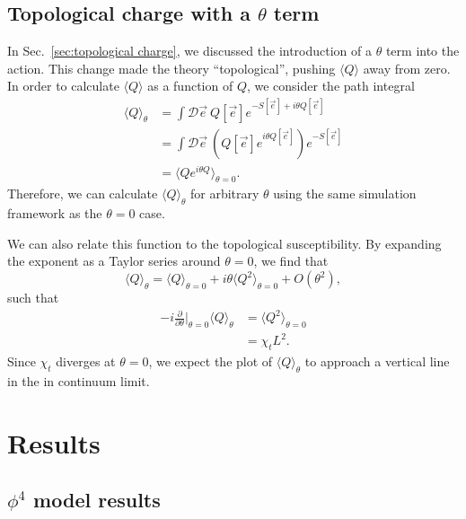 \documentclass[12pt]{report}
\newcommand{\e}{\vec e}
\begin{document}
\section{Topological charge with a $\theta$ term}
\label{sec:topotheta}
In Sec.~\ref{sec:topological charge}, we discussed the introduction of a $\theta$ term into the action. This change made the theory ``topological'', pushing $\langle Q \rangle$ away from zero. In order to calculate $\langle Q \rangle$ as a function of $Q$, we consider the path integral
\begin{align}
    \langle Q \rangle_\theta &=\int \mathcal{D}\e\:Q[\e]e^{-S[\e]+i\theta Q[\e]} \\
                             &=\int \mathcal{D}\e\:\left( Q[\e]e^{i\theta Q[\e]} \right) e^{-S[\e]} \\
                             &=\langle Q e^{i \theta Q} \rangle_{\theta=0}.
\end{align}
Therefore, we can calculate $\langle Q \rangle_\theta$ for arbitrary $\theta$ using the same simulation framework as the $\theta=0$ case.

We can also relate this function to the topological susceptibility. By expanding the exponent as a Taylor series around $\theta=0$, we find that  
\begin{equation}
    \langle Q \rangle_\theta = \langle Q \rangle_{\theta=0} + i \theta \langle Q^2 \rangle_{\theta=0} + O(\theta^2),
\end{equation}
such that 
\begin{align}
    -i \frac{\partial}{\partial \theta}\Big|_{\theta=0} \langle Q \rangle_\theta &= \langle Q^2 \rangle_{\theta=0}\\
                                                              &= \chi_t L^2.
\end{align}
Since $\chi_t$ diverges at $\theta=0$, we expect the plot of $\langle Q\rangle_\theta$ to approach a vertical line in the in continuum limit. 

\chapter{Results}
\section{$\phi^4$ model results}
\end{document}
